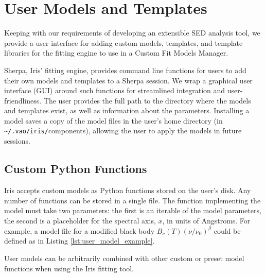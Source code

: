 \documentclass[preprint,authoryear,5p]{elsarticle}
\begin{document}

\section{User Models and Templates} \label{sec:usermodels}

Keeping with our requirements of developing an extensible SED analysis tool, we
provide a user interface for adding custom models, templates, and template
libraries for the fitting engine to use in a Custom Fit Models Manager.

\begin{sloppypar}
Sherpa, Iris' fitting engine, provides command line functions for users to add
their own models and templates to a Sherpa session. We wrap a graphical user 
interface (GUI) around such functions for streamlined integration and 
user-friendliness.
The user provides the full path to the directory where the models and templates
exist, as well as information about the parameters. Installing a model saves a
copy of the model files in the user's home directory (in
\texttt{\~{}/.vao/iris/}components), allowing the user to apply the models in future
sessions.
\end{sloppypar}

\subsection{Custom Python Functions} Iris accepts custom models as Python
functions stored on the user's disk. Any number of functions can be stored in a
single file. The function implementing the model must take two parameters: the
first is an iterable of the model parameters, the second is a placeholder for
the spectral axis, $x$, in units of Angstroms. For example, a model file for a
modified black body \(B_{\nu}(T) \left(\nu/\nu_{0}\right)^{\beta}\) could be
defined as in Listing \ref{lst:user_model_example}.

User models can be arbitrarily combined with other custom or preset model
functions when using the Iris fitting tool.
\end{document}
